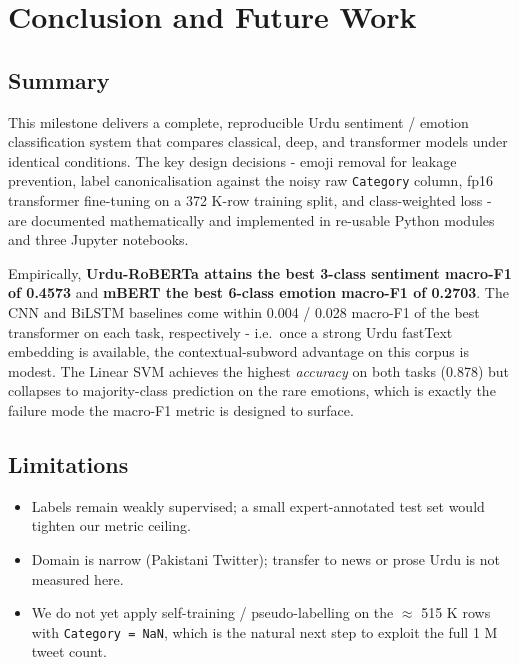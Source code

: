 \documentclass[
  english,
  11pt,
]{article}
\providecommand{\tightlist}{%
  \setlength{\itemsep}{0pt}\setlength{\parskip}{0pt}}
\begin{document}
\section{Conclusion and Future
Work}\label{conclusion-and-future-work}

\subsection{Summary}\label{summary}

This milestone delivers a complete, reproducible Urdu sentiment /
emotion classification system that compares classical, deep, and
transformer models under identical conditions. The key design decisions
- emoji removal for leakage prevention, label canonicalisation against
the noisy raw \texttt{Category} column, fp16 transformer fine-tuning on
a 372 K-row training split, and class-weighted loss - are documented
mathematically and implemented in re-usable Python modules and three
Jupyter notebooks.

Empirically, \textbf{Urdu-RoBERTa attains the best 3-class sentiment
macro-F1 of 0.4573} and \textbf{mBERT the best 6-class emotion macro-F1
of 0.2703}. The CNN and BiLSTM baselines come within 0.004 / 0.028
macro-F1 of the best transformer on each task, respectively -
i.e.~once a strong Urdu fastText embedding is available, the
contextual-subword advantage on this corpus is modest. The Linear SVM
achieves the highest \emph{accuracy} on both tasks (0.878) but collapses
to majority-class prediction on the rare emotions, which is exactly the
failure mode the macro-F1 metric is designed to surface.

\subsection{Limitations}\label{limitations}

\begin{itemize}
\tightlist
\item
  Labels remain weakly supervised; a small expert-annotated test set
  would tighten our metric ceiling.
\item
  Domain is narrow (Pakistani Twitter); transfer to news or prose Urdu
  is not measured here.
\item
  We do not yet apply self-training / pseudo-labelling on the
  \(\approx\) 515 K rows with \texttt{Category\ =\ NaN}, which is the
  natural next step to exploit the full 1 M tweet count.
\end{itemize}
\end{document}
